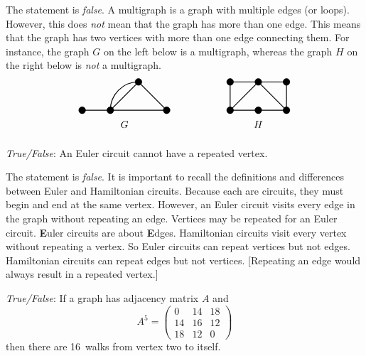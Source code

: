 \documentclass[11pt,letterpaper]{article}
\begin{document}
\sol The statement is \textit{false}. A multigraph is a graph with multiple edges (or loops). However, this does \textit{not} mean that the graph has more than one edge. This means that the graph has two vertices with more than one edge connecting them. For instance, the graph $G$ on the left below is a multigraph, whereas the graph $H$ on the right below is \textit{not} a multigraph. 
	\[
	\begin{tikzpicture}
	\draw[line width=0.03cm] (0,0) -- (1,0) -- (2,1) -- (3,0) -- (1,0);
	\draw[line width=0.03cm] (1,0) to[out=90, in= 180] (2,1);
	
	\draw[fill=black] (0,0) circle (0.12);
	\draw[fill=black] (1,0) circle (0.12);
	\draw[fill=black] (2,1) circle (0.12);
	\draw[fill=black] (3,0) circle (0.12);
	
	\node at (1.5,-0.5) {$G$};
	\end{tikzpicture} \hspace{2cm}
	\begin{tikzpicture}
	\draw[line width=0.03cm] (0,0) -- (2,0) -- (2,1) -- (0,1) -- (0,0);
	\draw[line width=0.03cm] (0,0) -- (1,1) -- (2,0);
	
	\draw[fill=black] (0,0) circle (0.12);
	\draw[fill=black] (1,0) circle (0.12);
	\draw[fill=black] (2,0) circle (0.12);
	\draw[fill=black] (0,1) circle (0.12);
	\draw[fill=black] (1,1) circle (0.12);
	\draw[fill=black] (2,1) circle (0.12);
	
	\node at (1,-0.5) {$H$};
	\end{tikzpicture}
	\] \pvspace{1.3cm}



\quizsol \textit{True/False}: An Euler circuit cannot have a repeated vertex. \pspace

\sol The statement is \textit{false}. It is important to recall the definitions and differences between Euler and Hamiltonian circuits. Because each are circuits, they must begin and end at the same vertex. However, an Euler circuit visits every edge in the graph without repeating an edge. Vertices may be repeated for an Euler circuit. \textbf{E}uler circuits are about \textbf{E}dges. Hamiltonian circuits visit every vertex without repeating a vertex. So Euler circuits can repeat vertices but not edges. Hamiltonian circuits can repeat edges but not vertices. [Repeating an edge would always result in a repeated vertex.] \pvspace{1.3cm}



\quizsol \textit{True/False}: If a graph has adjacency matrix $A$ and 
	\[
	A^5= \begin{pmatrix} 0 & 14 & 18 \\ 14 & 16 & 12 \\ 18 & 12 & 0 \end{pmatrix}
	\]
then there are 16~walks from vertex two to itself. \pspace
\end{document}
